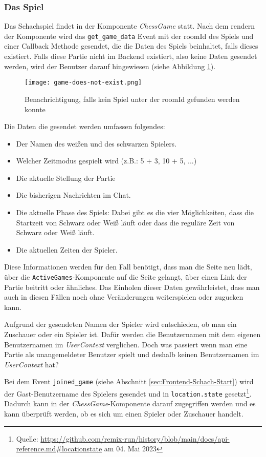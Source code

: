         \subsubsection{Das Spiel}
Das Schachspiel findet in der Komponente \textit{ChessGame} statt.
Nach dem rendern der Komponente wird das \verb|get_game_data| Event mit der roomId des Spiels und einer Callback Methode gesendet, die die Daten des Spiels beinhaltet, falls dieses existiert. Falls diese Partie nicht im Backend existiert, also keine Daten gesendet werden, wird der Benutzer darauf hingewiesen (siehe Abbildung \ref{fig:game-does-not-exist}).

\begin{figure}[h]
\centering
\texttt{[image: game-does-not-exist.png]}
\caption{Benachrichtigung, falls kein Spiel unter der roomId gefunden werden konnte}
\label{fig:game-does-not-exist}
\end{figure}

Die Daten die gesendet werden umfassen folgendes:
\begin{itemize}
\item Der Namen des weißen und des schwarzen Spielers.
\item Welcher Zeitmodus gespielt wird (z.B.: 5 + 3, 10 + 5, ...)
\item Die aktuelle Stellung der Partie
\item Die bisherigen Nachrichten im Chat.
\item Die aktuelle Phase des Spiels: Dabei gibt es die vier Möglichkeiten, dass die Startzeit von Schwarz oder Weiß läuft oder dass die reguläre Zeit von Schwarz oder Weiß läuft.
\item Die aktuellen Zeiten der Spieler.
\end{itemize}
Diese Informationen werden für den Fall benötigt, dass man die Seite neu lädt, über die \verb|ActiveGames|-Komponente auf die Seite gelangt, über einen Link der Partie beitritt oder ähnliches. Das Einholen dieser Daten gewährleistet, dass man auch in diesen Fällen noch ohne Veränderungen weiterspielen oder zugucken kann.

Aufgrund der gesendeten Namen der Spieler wird entschieden, ob man ein Zuschauer oder ein Spieler ist.  Dafür werden die Benutzernamen mit dem eigenen Benutzernamen im \textit{UserContext} verglichen. Doch was passiert wenn man eine Partie als unangemeldeter Benutzer spielt und deshalb keinen Benutzernamen im \textit{UserContext} hat?

Bei dem Event \verb|joined_game| (siehe Abschnitt \ref{sec:Frontend-Schach-Start}) wird der Gast-Benutzername des Spielers gesendet und in \verb|location.state| gesetzt\footnote{Quelle: \url{https://github.com/remix-run/history/blob/main/docs/api-reference.md\#locationstate} am 04. Mai 2023}. Dadurch kann in der \textit{ChessGame}-Komponente darauf zugegriffen werden und es kann überprüft werden, ob es sich um einen Spieler oder Zuschauer handelt.


